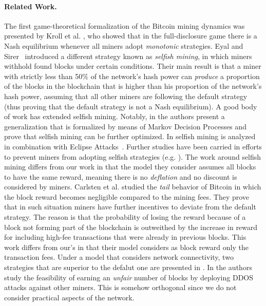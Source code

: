 \paragraph*{\bf Related Work.} The first game-theoretical formalization of the Bitcoin mining dynamics was presented by Kroll et al. \cite{economics_of_mining2013}, who showed that in the full-disclosure game there is a Nash equilibrium whenever all miners adopt \emph{monotonic} strategies. Eyal and Sirer~\cite{selfishmining2014} introduced a different strategy known as \emph{selfish mining}, in which miners withhold found blocks under certain conditions. Their main result is that a miner with strictly less than 50\% of the network's hash power can \emph{produce} a proportion of the blocks in the blockchain that is higher than his proportion of the network's hash power, assuming that all other miners are following the default strategy (thus proving that the default strategy is not a Nash equilibrium). A good body of work has extended selfish mining. Notably, in \cite{optimalselfishmining2017} the authors present a generalization that is formalized by means of Markov Decision Processes and prove that selfish mining can be further optimized. In \cite{stubborn_mining:2016} selfish mining is analyzed in combination with Eclipse Attacks~\cite{eclipseattacks2015}. Further studies have been carried in efforts to prevent miners from adopting selfish strategies (e.g. \cite{stop_selfish_mining2014,selfishmining2014}). The work around selfish mining differs from our work in that the model they consider assumes all blocks to have the same reward, meaning there is no \emph{deflation} and no discount is considered by miners. Carlsten et al. \cite{instabilitywithoutreward:2016} studied the \emph{tail} behavior of Bitcoin in which the block reward becomes negligible compared to the mining fees. They prove that in such situation miners have further incentives to deviate from the default strategy. The reason is that the probability of losing the reward because of a block not forming part of the blockchain is outweithed by the increase in reward for including high-fee transactions that were already in previous blocks. This work differs from our's in that their model considers as block reward only the transaction fees. Under a model that considers network connectivity, two strategies that are superior to the defalut one are presented in \cite{bitcoin_attacks_2013}. In \cite{ddos_attacks2014,empirical_dos_attacks2014} the authors study the feasibility of earning an \emph{unfair} number of blocks by deploying DDOS attacks against other miners. This is somehow orthogonal since we do not consider practical aspects of the network. 


